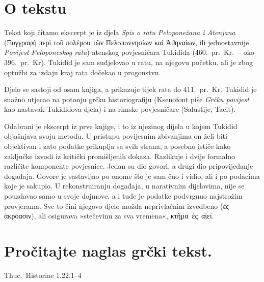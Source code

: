 


\section*{O tekstu}

Tekst koji čitamo ekscerpt je iz djela \textit{Spis o ratu Peloponežana i Atenjana} \textgreek[variant=ancient]{(Ξυγγραφὴ περὶ τoῦ πολέμoυ τῶν Пελoπoννησίων καὶ Ἀϑηναίων,} ili jednostavnije \textit{Povijest Peloponeskog rata}) atenskog povjesničara Tukidida (460.\ pr.~Kr.\ – oko 396.\ pr.~Kr). Tukidid je sam sudjelovao u ratu, na njegovu početku, ali je zbog optužbi za izdaju kraj rata dočekao u progonstvu. 

Djelo se sastoji od osam knjiga, a prikazuje tijek rata do 411.\ pr.~Kr. Tukidid je snažno utjecao na potonju grčku historiografiju (Ksenofont piše \textit{Grčku povijest} kao nastavak Tukididova djela) i na rimske povjesničare (Salustije, Tacit).

Odabrani je ekscerpt iz prve knjige, i to iz njezinog dijela u kojem Tukidid objašnjava svoju metodu. U pristupu povijesnim zbivanjima on želi biti objektivan i zato podatke prikuplja sa svih strana, a posebno ističe kako zaključke izvodi iz kritički promišljenih dokaza. Razlikuje i dvije formalno različite komponente povjesnice. Jedan su dio govori, a drugi dio pripovijedanje događaja. Govore je sastavljao po onome što je sam čuo i vidio, ali i po podacima koje je sakupio. U rekonstruiranju događaja, u narativnim dijelovima, nije se pouzdavao samo u svoje dojmove, a i tuđe je podatke podvrgnuo najstrožim provjerama. Sve to čini njegovo djelo možda neprivlačnim izvedbeno \textgreek[variant=ancient]{(ἐς ἀκρόασιν)}, ali osigurava »stečevinu za sva vremena«, \textgreek[variant=ancient]{κτῆμα ἐς αἰεί.}

\newpage

\section*{Pročitajte naglas grčki tekst.}

Thuc.\ Historiae 1.22.1–4


\medskip


